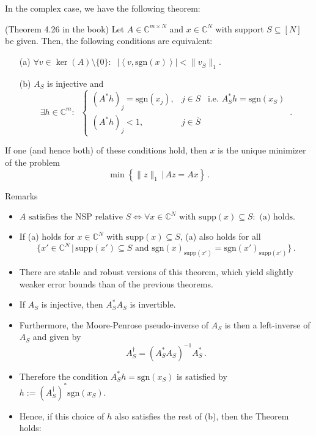 \documentclass[11pt]{beamer}
\newcommand{\CC}{\mathbb{C}}
\newcommand{\sgn}{\text{sgn}}
\newcommand{\p}[2]{\left\langle #1,#2\right\rangle}
\newcommand{\supp}{\text{supp}}
\begin{document}
\begin{frame}
	In the complex case, we have the following theorem:
	\begin{Satzz}
		{(Theorem 4.26 in the book)}{} Let \(A\in\CC^{m\times N}\) and \(x\in\CC^N\) with support \(S\subseteq[N]\) be given. Then, the following conditions are equivalent:
		\begin{itemize}
			\item[(a)] \(\forall v\in \ker(A)\setminus\{0\}:\;\;|\p{v}{\sgn(x)}|< \|v_{\overline S}\|_1\).
			\item[(b)] \(A_S\) is injective and 
			\[\exists h\in \CC^m:\;\;\left\{\begin{array}{cl}
				(A^*h)_j=\sgn(x_j),&j\in S\;\;\;\text{i.e. }A^*_Sh=\sgn(x_S)\\
				(A^*h)_j<1,&j\in \overline S
			\end{array}\right.\,.\]
			\end{itemize}
			If one (and hence both) of these conditions hold, then \(x\) is the unique minimizer of the problem
			\[\min\left\{\|z\|_1\,\big|\,Az=Ax\right\}\,.\]
	\end{Satzz}
	
\end{frame}

\begin{frame}{Remarks}
	\begin{itemize}
		\item \(A\text{ satisfies the NSP relative }S\iff \forall x\in \CC^N \text{ with }\supp(x)\subseteq S:\text{ (a) holds}.\)
		\item If (a) holds for \(x\in \CC^N \) with \(\supp(x)\subseteq S\), (a) also holds for all 
		\[\{x'\in \CC^N\,|\, \supp (x') \subseteq S\text{ and }\sgn(x)_{\supp(x')}=\sgn(x')_{\supp(x')}\}\,.\]
		\item There are stable and robust versions of this theorem, which yield slightly weaker error bounds than of the previous theorems.
	\end{itemize}
\end{frame}

\begin{frame}
	\begin{itemize}
		\item If \(A_S \) is injective, then \(A_S^*A_S\) is invertible.
		\item Furthermore, the Moore-Penrose pseudo-inverse of \(A_S\) is then a left-inverse of \(A_S\) and given by
		\[A_S^{\dagger}=(A_S^*A_S)^{-1}A_S^*\,.\]
		\item Therefore the condition \(A^*_Sh=\sgn(x_S)\) is satisfied by \(h:=(A_S^{\dagger})^*\sgn(x_S)\).
		\item Hence, if this choice of \(h\) also satisfies the rest of (b), then the Theorem holds:
	\end{itemize}
\end{frame}
\end{document}
